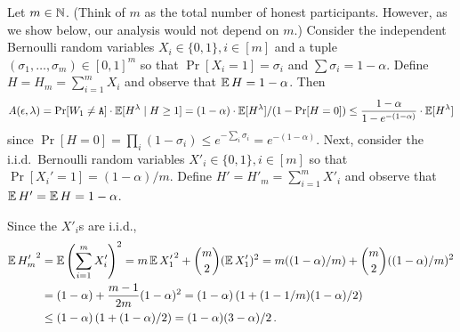   Let $m \in \mathbb{N}$. 
  (Think of $m$ as the total number of honest participants. 
  However, as we show below, our analysis would not depend on $m$.)
  Consider the independent Bernoulli random variables $X_i \in \{0, 1\}, i \in [m]$ 
  and a tuple $(\sigma_1, \ldots, \sigma_m) \in [0,1]^m$ 
  so that $\Pr[X_i = 1] = \sigma_i$ 
  and $\sum \sigma_i = 1 - \alpha$. 
  Define $H = H_m = \sum_{i =1}^m X_i$ and observe that $\operatorname{\mathbb{E}} H = 1 - \alpha$. 
  Then 
  $$
    A(\epsilon, \lambda) 
    = \Pr[W_1 \neq \mathtt{A}] \cdot \operatorname{\mathbb{E}}[H^\lambda \mid H \geq 1]
    = (1-\alpha) \cdot \operatorname{\mathbb{E}}[H^\lambda]/(1 - \Pr[H = 0])
    \leq \frac{1 - \alpha}{1 - e^{-(1 - \alpha)}} \cdot \operatorname{\mathbb{E}}[H^\lambda]
  $$ 
  since $\Pr[H = 0] = \prod_i (1 - \sigma_i) \leq e^{-\sum_i \sigma_i} = e^{-(1 - \alpha)}$.
  Next, consider the i.i.d.\ Bernoulli random variables $X'_i \in \{0, 1\}, i \in [m]$ 
  so that $\Pr[X_i' = 1] = (1-\alpha)/m$. 
  Define $H' = H'_m = \sum_{i =1}^m X'_i$ and observe that $\operatorname{\mathbb{E}} H' = \operatorname{\mathbb{E}} H = 1 - \alpha$. 




  Since the $X'_i$s are i.i.d., 
  \begin{align*}
    \operatorname{\mathbb{E}} {H'_m}^2 
    &= \operatorname{\mathbb{E}} \left(\sum_{i = 1}^m X'_i \right)^2
    = m \operatorname{\mathbb{E}} {X'_1}^2 + \binom{m}{2} (\operatorname{\mathbb{E}} X'_1)^2
    = m ((1-\alpha)/m) + \binom{m}{2} ((1 - \alpha)/m)^2 \\
    &= (1-\alpha) + \frac{m-1}{2m} (1 - \alpha)^2
    = (1-\alpha) \left( 1 + (1 - 1/m) (1 - \alpha)/2 \right) \\
    &\leq (1-\alpha) \left( 1 + (1 - \alpha)/2 \right)
    = (1-\alpha) (3 - \alpha)/2
    \,.    
  \end{align*}


